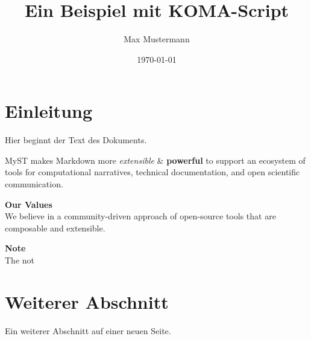 \documentclass{scrartcl} %
\begin{document}
\title{Ein Beispiel mit KOMA-Script}
\author{Max Mustermann}
\date{\today}
\maketitle

\newpage
\section{Einleitung}
Hier beginnt der Text des Dokuments.

MyST makes Markdown more \textit{extensible} \& \textbf{powerful} to support an ecosystem of tools for computational narratives, technical documentation, and open scientific communication.

\begin{framed}
\textbf{Our Values}\\
We believe in a community-driven approach of open-source tools that are composable and extensible.
\end{framed}

\begin{framed}
\textbf{Note}\\
The not
\end{framed}

\newpage
\section{Weiterer Abschnitt}
Ein weiterer Abschnitt auf einer neuen Seite.
\end{document}
